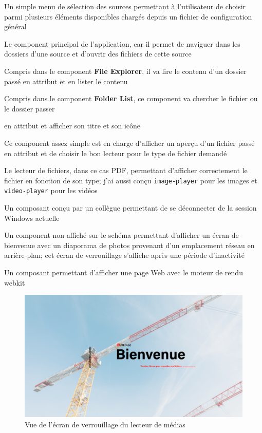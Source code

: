 \begin{description}
    \item[Source Selector] Un simple menu de sélection des sources permettant à l'utilisateur de choisir parmi plusieurs éléments disponibles chargés depuis un fichier de configuration général
    \item[File Explorer] Le component principal de l'application, car il permet de naviguer dans les dossiers d'une source et d'ouvrir des fichiers  de cette source
    \item[Folder List] Compris dans le component \textbf{File Explorer}, il va lire le contenu d'un dossier passé en attribut et en lister le contenu
    \item[File System Element] Compris dans le component \textbf{Folder List}, ce component va chercher le fichier ou le dossier passer
    \item en attribut et afficher son titre et son icône
    \item[File Viewer] Ce component assez simple est en charge d'afficher un aperçu d'un fichier passé en attribut et de choisir le bon lecteur pour le type de fichier demandé
    \item[PDF Player] Le lecteur de fichiers, dans ce cas PDF, permettant d'afficher correctement le fichier en fonction de son type; j’ai aussi conçu \texttt{image-player} pour les images et \texttt{video-player} pour les vidéos
    \item[Logout] Un composant conçu par un collègue permettant de se déconnecter de la session Windows actuelle
    \item[Lock Screen] Un component non affiché sur le schéma permettant d'afficher un écran de bienvenue avec un diaporama de photos provenant d'un emplacement réseau en arrière-plan; cet écran de verrouillage s'affiche après une période d'inactivité
    \item[Web Frame] Un composant permettant d'afficher une page Web avec le moteur de rendu webkit
\end{description}

\begin{figure}[h]
    \centering
    \includegraphics[scale=0.5]{img/media-reader-lock.png}
    \caption{Vue de l'écran de verrouillage du lecteur de médias}
\end{figure}

